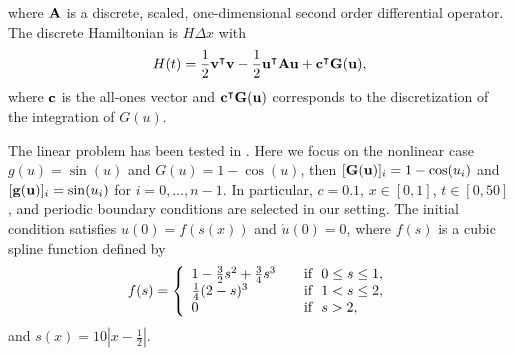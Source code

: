 \documentclass[11pt]{article}
\begin{document}
where ${\bf A}$ is a discrete, scaled, one-dimensional second order differential operator.
The discrete Hamiltonian is $H\Delta x$ with 
$$
H(t) = \frac{1}{2} {\bf v}^\intercal {\bf v} - \frac{1}{2} {\bf u}^\intercal {\bf A} {\bf u} + {\bf c}^\intercal {\bf G}({\bf u}),
$$   
where ${\bf c}$ is the all-ones vector and ${\bf c}^\intercal {{\bf G}}({{\bf u}})$ corresponds to the discretization of the integration of ${G}(u)$. 

The linear problem has been tested in \cite{peng2016symplectic,gong2017structure}. Here we focus on the nonlinear case $g(u) = \sin(u)$ and ${G}({u})= 1-\cos(u)$, then $[{\bf G}({\bf u})]_i= 1-\cos(u_i)$ and $[{\bf g}({\bf u})]_i = \sin(u_i)$ for $i=0, \ldots, n-1$.
In particular, $c= 0.1$, $x\in [0, 1]$, $t\in [0, 50]$, and periodic boundary conditions are selected in our setting.
The initial condition satisfies $u(0)=f(s(x))$ and $\dot{u}(0)=0$, where $f(s)$ is a cubic spline function defined by
\begin{equation*}
f(s) =
\left\{
\begin{array}{ll}
1-\frac{3}{2}s^2+\frac{3}{4}s^3 & \text{\quad if  \,\,} 0\leq s\leq 1, \\
\frac{1}{4}(2-s)^3 		       & \text{\quad if  \,\,} 1< s\leq 2, \\
0					       & \text{\quad if  \,\,} s> 2,
\end{array}
\right.
\end{equation*}
and $s(x)= 10|x-\frac{1}{2}|$.
\end{document}
